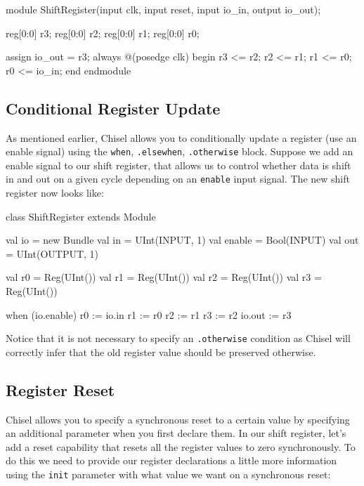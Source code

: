 \begin{bash}
module ShiftRegister(input clk, input reset,
    input  io_in,
    output io_out);

  reg[0:0] r3;
  reg[0:0] r2;
  reg[0:0] r1;
  reg[0:0] r0;

  assign io_out = r3;
  always @(posedge clk) begin
    r3 <= r2;
    r2 <= r1;
    r1 <= r0;
    r0 <= io_in;
  end
endmodule
\end{bash}

\subsection{Conditional Register Update}

As mentioned earlier, Chisel allows you to conditionally update a register (use an enable signal) using the \verb+when+, \verb+.elsewhen+, \verb+.otherwise+ block. Suppose we add an enable signal to our shift register, that allows us to control whether data is shift in and out on a given cycle depending on an \verb+enable+ input signal. The new shift register now looks like:

\begin{scala}
class ShiftRegister extends Module {
  val io = new Bundle {
    val in     = UInt(INPUT, 1)
    val enable = Bool(INPUT)
    val out    = UInt(OUTPUT, 1)
  }

  val r0 = Reg(UInt())
  val r1 = Reg(UInt())
  val r2 = Reg(UInt())
  val r3 = Reg(UInt())

  when (io.enable) {
    r0 := io.in
    r1 := r0
    r2 := r1
    r3 := r2
  }
  io.out := r3
}
\end{scala}

Notice that it is not necessary to specify an \verb+.otherwise+ condition as Chisel will correctly infer that the old register value should be preserved otherwise.

\subsection{Register Reset}

Chisel allows you to specify a synchronous reset to a certain value by specifying an additional parameter when you first declare them. In our shift register, let's add a reset capability that resets all the register values to zero synchronously. To do this we need to provide our register declarations a little more information using the \verb+init+ parameter with what value we want on a synchronous reset:


